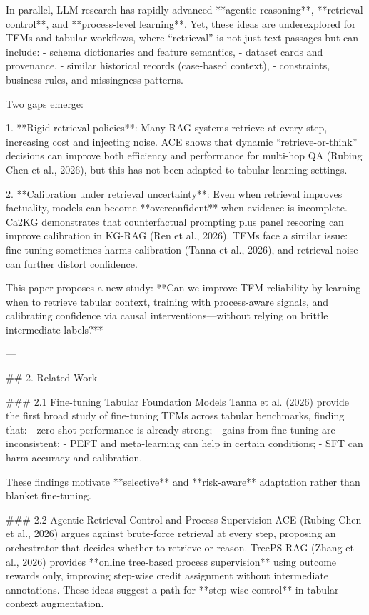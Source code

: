 In parallel, LLM research has rapidly advanced **agentic reasoning**, **retrieval control**, and **process-level learning**. Yet, these ideas are underexplored for TFMs and tabular workflows, where “retrieval” is not just text passages but can include:  
- schema dictionaries and feature semantics,  
- dataset cards and provenance,  
- similar historical records (case-based context),  
- constraints, business rules, and missingness patterns.

Two gaps emerge:

1. **Rigid retrieval policies**: Many RAG systems retrieve at every step, increasing cost and injecting noise. ACE shows that dynamic “retrieve-or-think” decisions can improve both efficiency and performance for multi-hop QA (Rubing Chen et al., 2026), but this has not been adapted to tabular learning settings.

2. **Calibration under retrieval uncertainty**: Even when retrieval improves factuality, models can become **overconfident** when evidence is incomplete. Ca2KG demonstrates that counterfactual prompting plus panel rescoring can improve calibration in KG-RAG (Ren et al., 2026). TFMs face a similar issue: fine-tuning sometimes harms calibration (Tanna et al., 2026), and retrieval noise can further distort confidence.

This paper proposes a new study: **Can we improve TFM reliability by learning when to retrieve tabular context, training with process-aware signals, and calibrating confidence via causal interventions—without relying on brittle intermediate labels?**

---

## 2. Related Work  

### 2.1 Fine-tuning Tabular Foundation Models  
Tanna et al. (2026) provide the first broad study of fine-tuning TFMs across tabular benchmarks, finding that:  
- zero-shot performance is already strong;  
- gains from fine-tuning are inconsistent;  
- PEFT and meta-learning can help in certain conditions;  
- SFT can harm accuracy and calibration.

These findings motivate **selective** and **risk-aware** adaptation rather than blanket fine-tuning.

### 2.2 Agentic Retrieval Control and Process Supervision  
ACE (Rubing Chen et al., 2026) argues against brute-force retrieval at every step, proposing an orchestrator that decides whether to retrieve or reason. TreePS-RAG (Zhang et al., 2026) provides **online tree-based process supervision** using outcome rewards only, improving step-wise credit assignment without intermediate annotations. These ideas suggest a path for **step-wise control** in tabular context augmentation.

